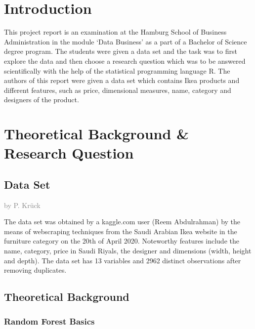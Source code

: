 \documentclass[a4paper, nobind]{templates/ociamthesis}
\begin{document}
\flushbottom

\hypertarget{intro}{%
\chapter{Introduction}\label{intro}}

This project report is an examination at the Hamburg School of Business Administration in the module `Data Business' as a part of a Bachelor of Science degree program. The students were given a data set and the task was to first explore the data and then choose a research question which was to be answered scientifically with the help of the statistical programming language R. The authors of this report were given a data set which contains Ikea products and different features, such as price, dimensional measures, name, category and designers of the product.

\hypertarget{theoretical-background-research-question}{%
\chapter{Theoretical Background \& Research Question}\label{theoretical-background-research-question}}

\hypertarget{data-set}{%
\section{Data Set}\label{data-set}}

\textcolor{gray}{by P. Krück}

The data set was obtained by a kaggle.com user (Reem Abdulrahman) by the means of webscraping techniques from the Saudi Arabian Ikea website in the furniture category on the 20th of April 2020. Noteworthy features include the name, category, price in Saudi Riyals, the designer and dimensions (width, height and depth).
The data set has 13 variables and 2962 distinct observations after removing duplicates.

\hypertarget{theoretical-background}{%
\section{Theoretical Background}\label{theoretical-background}}

\hypertarget{random-forest-basics}{%
\subsection{Random Forest Basics}\label{random-forest-basics}}
\end{document}
